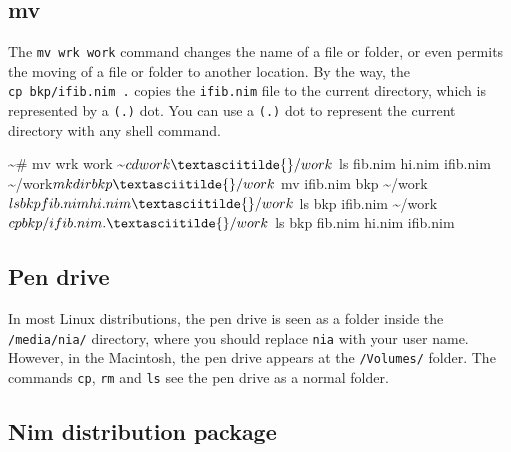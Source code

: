 \documentclass[
  12pt,
]{book}
\newenvironment{Shaded}{}{}
\newcommand{\ExtensionTok}[1]{#1}
\newcommand{\NormalTok}[1]{#1}
\begin{document}
\subsection*{mv}\label{mv}

The \texttt{mv\ wrk\ work} command changes the name of a file or folder,
or even permits the moving of a file or folder to another location. By
the way, the \texttt{cp\ bkp/ifib.nim\ .} copies the \texttt{ifib.nim}
file to the current directory, which is represented by a \texttt{(.)}
dot. You can use a \texttt{(.)} dot to represent the current directory
with any shell command.

\begin{Shaded}
\begin{Highlighting}[]
\ExtensionTok{\textasciitilde{}\#}\NormalTok{ mv wrk work}
\ExtensionTok{\textasciitilde{}$}\NormalTok{ cd work}
\ExtensionTok{\textasciitilde{}/work$}\NormalTok{ ls}
\ExtensionTok{fib.nim}\NormalTok{  hi.nim   ifib.nim}
\ExtensionTok{\textasciitilde{}/work$}\NormalTok{ mkdir bkp}
\ExtensionTok{\textasciitilde{}/work$}\NormalTok{ mv ifib.nim bkp}
\ExtensionTok{\textasciitilde{}/work$}\NormalTok{ ls}
\ExtensionTok{bkp}\NormalTok{     fib.nim hi.nim}
\ExtensionTok{\textasciitilde{}/work$}\NormalTok{ ls bkp}
\ExtensionTok{ifib.nim}
\ExtensionTok{\textasciitilde{}/work$}\NormalTok{ cp bkp/ifib.nim .}
\ExtensionTok{\textasciitilde{}/work$}\NormalTok{ ls}
\ExtensionTok{bkp}\NormalTok{      fib.nim  hi.nim   ifib.nim}
\end{Highlighting}
\end{Shaded}

\subsection*{Pen drive}\label{Pen}

In most Linux distributions, the pen drive is seen as a folder inside
the \texttt{/media/nia/} directory, where you should replace
\texttt{nia} with your user name. However, in the Macintosh, the pen
drive appears at the \texttt{/Volumes/} folder. The commands
\texttt{cp}, \texttt{rm} and \texttt{ls} see the pen drive as a normal
folder.

\subsection*{Nim distribution package}\label{Nim}
\end{document}
